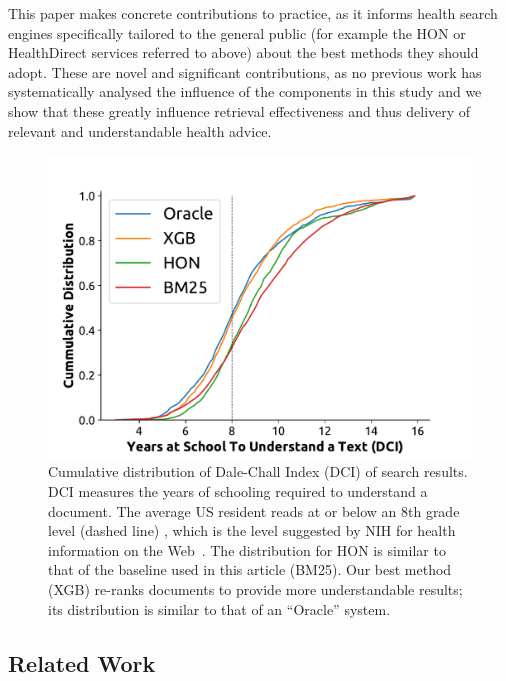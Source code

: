 \documentclass[10pt,a4paper]{article}
\begin{document}
This paper makes concrete contributions to practice, as it informs health search engines specifically tailored to the general public (for example the HON or HealthDirect services referred to above) about the best methods they should adopt. These are novel and significant contributions, as no previous work has systematically analysed the influence of the components in this study and we show that these greatly influence retrieval effectiveness and thus delivery of relevant and understandable health advice.

\begin{figure}[t!]
	\centering
	\includegraphics[width=.51\textwidth]{graphics/cumdist}
	\caption{Cumulative distribution of Dale-Chall Index (DCI) of search results. DCI measures the years of schooling required to understand a document. The average US resident reads at or below an 8th grade level (dashed line) \cite{cowan04,wallace04,davis04,stossel12}, which is the level suggested by NIH for health information on the Web~\cite{clear94}. The distribution for HON is similar to that of the baseline used in this article (BM25). Our best method (XGB) re-ranks documents to provide more understandable results; its distribution is similar to that of an ``Oracle'' system.}
	\label{fig:dist}
\end{figure}






\subsection*{Related Work}
\end{document}
